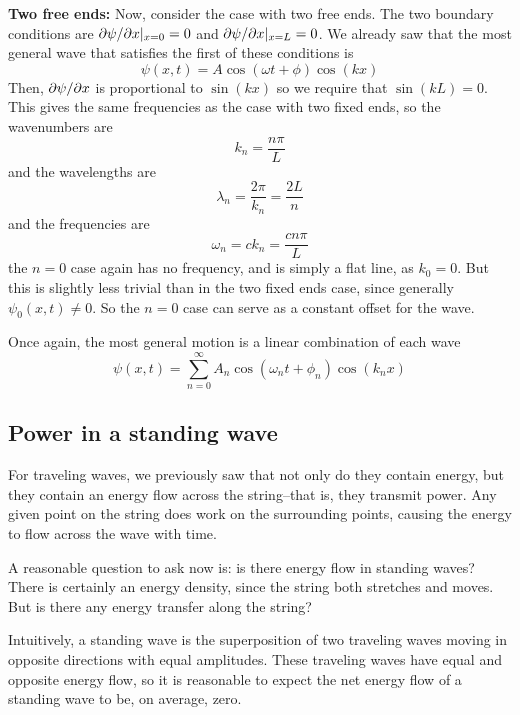 \textbf{Two free ends:} Now, consider the case with two free ends. The two boundary conditions are $\partial \psi/\partial x|_{x=0} = 0$ and $\partial \psi/\partial x|_{x=L} = 0$. We already saw that the most general wave that satisfies the first of these conditions is
\[ \psi(x,t) = A\cos(\omega t+\phi)\cos(kx) \]
Then, $\partial \psi/\partial x$ is proportional to $\sin(kx)$ so we require that $\sin(kL) = 0$. This gives the same frequencies as the case with two fixed ends, so the wavenumbers are
\[ k_n = \frac{n\pi}{L}\]
and the wavelengths are
\[ \lambda_n = \frac{2\pi}{k_n} = \frac{2L}{n} \]
and the frequencies are
\[ \omega_n = ck_n = \frac{cn\pi}{L} \]
the $n=0$ case again has no frequency, and is simply a flat line, as $k_0=0$. But this is slightly less trivial than in the two fixed ends case, since generally $\psi_0(x,t) \ne 0$. So the $n=0$ case can serve as a constant offset for the wave. 

Once again, the most general motion is a linear combination of each wave
\[ \psi(x,t) = \sum_{n=0}^\infty A_n\cos(\omega_nt+\phi_n)\cos(k_nx) \]
\subsection*{Power in a standing wave}
For traveling waves, we previously saw that not only do they contain energy, but they contain an energy flow across the string--that is, they transmit power. Any given point on the string does work on the surrounding points, causing the energy to flow across the wave with time.

A reasonable question to ask now is: is there energy flow in standing waves? There is certainly an energy density, since the string both stretches and moves. But is there any energy transfer along the string?

Intuitively, a standing wave is the superposition of two traveling waves moving in opposite directions with equal amplitudes. These traveling waves have equal and opposite energy flow, so it is reasonable to expect the net energy flow of a standing wave to be, on average, zero. 

